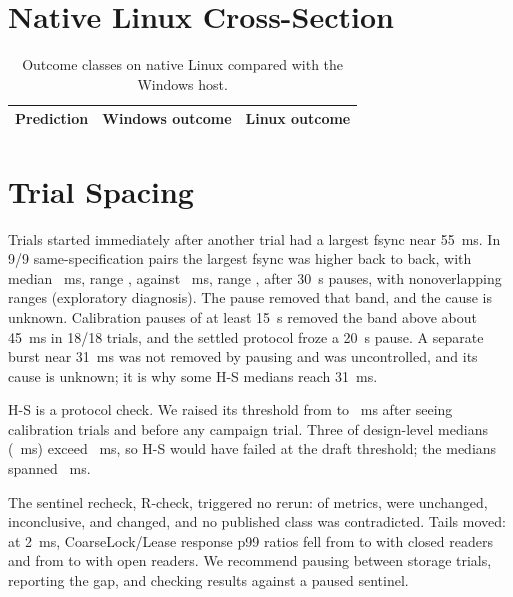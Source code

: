 \documentclass[conference]{IEEEtran}
\begin{document}
\section{Native Linux Cross-Section}
\label{sec:linux}
\begin{table}[t]
\caption{Outcome classes on native Linux compared with the Windows host.}
\label{tab:linux}\centering\scriptsize
\begin{tabular}{lll}\toprule
Prediction & Windows outcome & Linux outcome\\\midrule
\bottomrule\end{tabular}
\end{table}
\fi

\section{Trial Spacing}
\label{sec:spacing}
Trials started immediately after another trial had a largest fsync near 55~ms. In 9/9 same-specification pairs the largest fsync was higher back to back, with median \StallBackMedian{}~ms, range \StallBackRange{}, against \StallSettledMedian{}~ms, range \StallSettledRange{}, after 30~s pauses, with nonoverlapping ranges (exploratory diagnosis). The pause removed that band, and the cause is unknown. Calibration pauses of at least 15~s removed the band above about 45~ms in 18/18 trials, and the settled protocol froze a 20~s pause. A separate burst near 31~ms was not removed by pausing and was uncontrolled, and its cause is unknown; it is why some H-S medians reach 31~ms.

H-S is a protocol check. We raised its threshold from \HSDraftMs{} to \HSThresholdMs{}~ms after seeing calibration trials and before any campaign trial. Three of \HSDesignCount{} design-level medians (\HSAboveDraftRange{}~ms) exceed \HSDraftMs{}~ms, so H-S would have failed at the draft threshold; the medians spanned \SettledHSRange{}~ms.

The sentinel recheck, R-check, triggered no rerun: of \SettledSentinelTotal{} metrics, \SettledSentinelUnchanged{} were unchanged, \SettledSentinelInconclusive{} inconclusive, and \SettledSentinelChanged{} changed, and no published class was contradicted. Tails moved: at 2~ms, CoarseLock/Lease response p99 ratios fell from \SettledTailRatioClosedOld{} to \SettledTailRatioClosedNew{} with closed readers and from \SettledTailRatioOpenOld{} to \SettledTailRatioOpenNew{} with open readers. We recommend pausing between storage trials, reporting the gap, and checking results against a paused sentinel.
\end{document}
